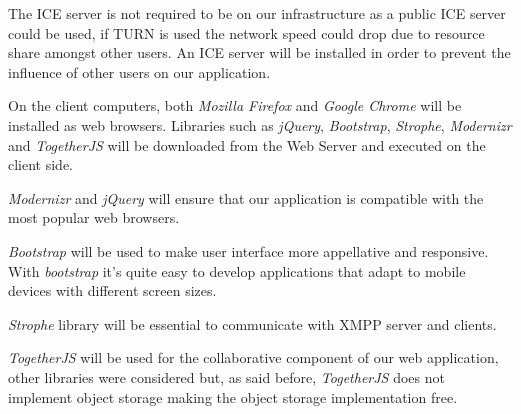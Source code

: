 The \ac{ICE} server is not required to be on our infrastructure as a public \ac{ICE} server could be used, if \ac{TURN} is used the network speed could drop due to resource share amongst other users. An \ac{ICE} server will be installed in order to prevent the influence of other users on our application.

On the client computers, both \emph{Mozilla Firefox} and \emph{Google Chrome} will be installed as web browsers. Libraries such as \emph{jQuery}, \emph{Bootstrap}, \emph{Strophe}, \emph{Modernizr} and \emph{TogetherJS} will be downloaded from the Web Server and executed on the client side.

\emph{Modernizr} and \emph{jQuery} will ensure that our application is compatible with the most popular web browsers.

\emph{Bootstrap} will be used to make user interface more appellative and responsive. With \emph{bootstrap} it's quite easy to develop applications that adapt to mobile devices with different screen sizes.

\emph{Strophe} library will be essential to communicate with \ac{XMPP} server and clients.

\emph{TogetherJS} will be used for the collaborative component of our web application, other libraries were considered but, as said before, \emph{TogetherJS} does not implement object storage making the object storage implementation free.